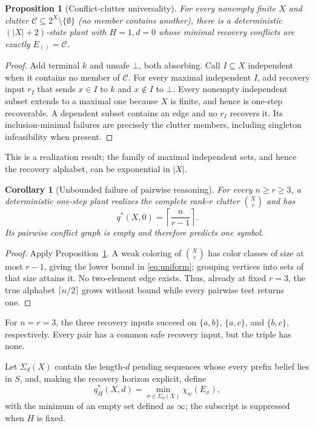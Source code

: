 \documentclass[letterpaper,10pt,conference]{ieeeconf}
\newtheorem{proposition}{Proposition}
\newtheorem{corollary}{Corollary}
\begin{document}
\begin{proposition}[Conflict-clutter universality]\label{prop:universality}
For every nonempty finite $X$ and clutter $\mathcal C\subseteq2^X\setminus\{\emptyset\}$ (no member contains
another), there is a deterministic $(|X|+2)$-state plant with $H=1,d=0$ whose minimal recovery
conflicts are exactly $E_{()}=\mathcal C$.
\end{proposition}
\begin{proof}
Add terminal $k$ and unsafe $\bot$, both absorbing. Call $I\subseteq X$ independent when it
contains no member of $\mathcal C$. For every maximal independent $I$, add recovery input $r_I$
that sends $x\in I$ to $k$ and $x\notin I$ to $\bot$. Every nonempty independent subset extends to a
maximal one because $X$ is finite, and hence is one-step recoverable. A dependent subset contains
an edge and no $r_I$ recovers it. Its inclusion-minimal failures are precisely the clutter
members, including singleton infeasibility when present.
\end{proof}
This is a realization result; the family of maximal independent sets, and hence the recovery
alphabet, can be exponential in $|X|$.

\begin{corollary}[Unbounded failure of pairwise reasoning]\label{cor:uniform}
For every $n\ge r\ge3$, a deterministic one-step plant realizes the complete rank-$r$ clutter
$\binom{X}{r}$ and has
\begin{equation}
q^*(X,0)=\left\lceil\frac{n}{r-1}\right\rceil .             \label{eq:uniform}
\end{equation}
Its pairwise conflict graph is empty and therefore predicts one symbol.
\end{corollary}
\begin{proof}
Apply Proposition~\ref{prop:universality}. A weak coloring of $\binom{X}{r}$ has color classes of
size at most $r-1$, giving the lower bound in \eqref{eq:uniform}; grouping vertices into sets of
that size attains it. No two-element edge exists. Thus, already at fixed $r=3$, the true alphabet
$\lceil n/2\rceil$ grows without bound while every pairwise test returns one.
\end{proof}
For $n=r=3$, the three recovery inputs succeed on $\{a,b\}$, $\{a,c\}$, and $\{b,c\}$,
respectively. Every pair has a common safe recovery input, but the triple has none.

Let $\Sigma_d(X)$ contain the length-$d$ pending sequences whose every prefix belief lies in $S$,
and, making the recovery horizon explicit, define
\begin{equation}
 q_H^*(X,d)=\min_{\sigma\in\Sigma_d(X)}\chi_w(E_\sigma),       \label{eq:frontier}
\end{equation}
with the minimum of an empty set defined as $\infty$; the subscript is suppressed when $H$ is fixed.
\end{document}
